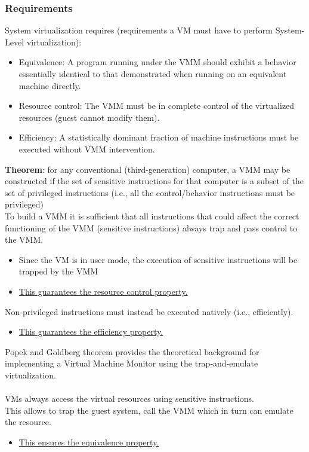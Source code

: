 \documentclass[10pt, oneside]{article}
\begin{document}
\subsubsection{Requirements}
System virtualization requires (requirements a VM must have to perform System-Level virtualization):\begin{itemize}
    \item Equivalence: A program running under the VMM should exhibit a behavior essentially identical to that demonstrated when running on an equivalent machine directly.
    \item Resource control: The VMM must be in complete control of the virtualized resources (guest cannot modify them).
    \item Efficiency: A statistically dominant fraction of machine instructions must be executed without VMM intervention.
\end{itemize}
{\bf Theorem}: for any conventional (third-generation) computer, a VMM may be constructed if the set of sensitive instructions for that computer is a subset of the set of privileged instructions (i.e., all the control/behavior instructions must be privileged)\\
\newline
To build a VMM it is sufficient that all instructions that could affect the correct functioning of the VMM (sensitive instructions) always trap and pass control to the VMM.\begin{itemize}
    \item Since the VM is in user mode, the execution of sensitive instructions will be trapped by the VMM
    \item \underline{This guarantees the resource control property.}
\end{itemize}
Non-privileged instructions must instead be executed natively (i.e.,
efficiently).\begin{itemize}
    \item \underline{This guarantees the efficiency property.}
\end{itemize}
Popek and Goldberg theorem provides the theoretical background for implementing a Virtual Machine Monitor using the trap-and-emulate virtualization.\\\\VMs always access the virtual resources using sensitive instructions.\\This allows to trap the guest system, call the VMM which in turn can emulate the resource.\begin{itemize}
    \item \underline{This ensures the equivalence property.}
\end{itemize}
\end{document}
